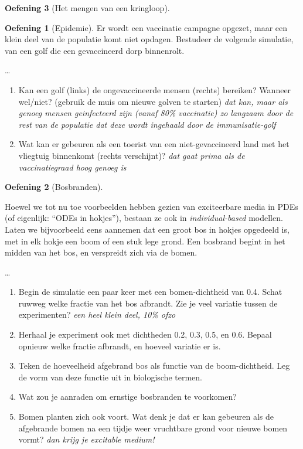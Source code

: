 \documentclass[
  a4paper,
]{scrbook}
\providecommand{\tightlist}{%
  \setlength{\itemsep}{0pt}\setlength{\parskip}{0pt}}\usepackage{longtable,booktabs,array}
\theoremstyle{definition}
\newtheorem{exercise}{Oefening}[chapter]
\theoremstyle{remark}
\begin{document}
\begin{exercise}[Het mengen van een
kringloop]
\begin{exercise}[Epidemie]
Er wordt een vaccinatie campagne opgezet, maar een klein deel van de
populatie komt niet opdagen. Bestudeer de volgende simulatie, van een
golf die een gevaccineerd dorp binnenrolt.

\ldots{}

\begin{enumerate}
\def\labelenumi{\alph{enumi}.}
\setcounter{enumi}{2}
\tightlist
\item
  Kan een golf (links) de ongevaccineerde mensen (rechts) bereiken?
  Wanneer wel/niet? (gebruik de muis om nieuwe golven te starten)
  \emph{dat kan, maar als genoeg mensen geinfecteerd zijn (vanaf 80\%
  vaccinatie) zo langzaam door de rest van de populatie dat deze wordt
  ingehaald door de immunisatie-golf}
\item
  Wat kan er gebeuren als een toerist van een niet-gevaccineerd land met
  het vliegtuig binnenkomt (rechts verschijnt)? \emph{dat gaat prima als
  de vaccinatiegraad hoog genoeg is}
\end{enumerate}

\end{exercise}

\begin{exercise}[Bosbranden]\protect\hypertarget{exr-bosbranden}{}\label{exr-bosbranden}

Hoewel we tot nu toe voorbeelden hebben gezien van exciteerbare media in
PDEs (of eigenlijk: ``ODEs in hokjes''), bestaan ze ook in
\emph{individual-based} modellen. Laten we bijvoorbeeld eens aannemen
dat een groot bos in hokjes opgedeeld is, met in elk hokje een boom of
een stuk lege grond. Een bosbrand begint in het midden van het bos, en
verspreidt zich via de bomen.

\ldots{}

\begin{enumerate}
\def\labelenumi{\alph{enumi}.}
\tightlist
\item
  Begin de simulatie een paar keer met een bomen-dichtheid van 0.4.
  Schat ruwweg welke fractie van het bos afbrandt. Zie je veel variatie
  tussen de experimenten? \emph{een heel klein deel, 10\% ofzo}
\item
  Herhaal je experiment ook met dichtheden 0.2, 0.3, 0.5, en 0.6. Bepaal
  opnieuw welke fractie afbrandt, en hoeveel variatie er is.
\item
  Teken de hoeveelheid afgebrand bos als functie van de boom-dichtheid.
  Leg de vorm van deze functie uit in biologische termen.
\item
  Wat zou je aanraden om ernstige bosbranden te voorkomen?
\item
  Bomen planten zich ook voort. Wat denk je dat er kan gebeuren als de
  afgebrande bomen na een tijdje weer vruchtbare grond voor nieuwe bomen
  vormt? \emph{dan krijg je excitable medium!}
\end{enumerate}


\end{exercise}
\end{exercise}
\end{document}

